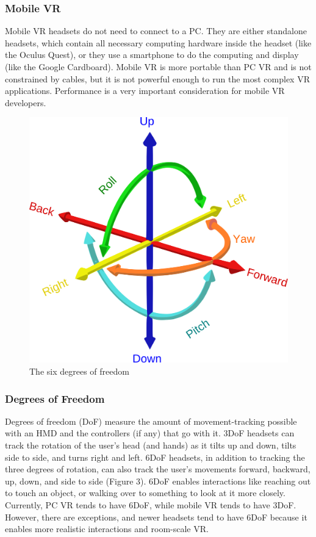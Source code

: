 \documentclass{article}
\begin{document}
\subsubsection{Mobile VR} Mobile VR headsets do not need to connect to a PC. They are either standalone headsets, which contain all necessary computing hardware inside the headset (like the Oculus Quest), or they use a smartphone to do the computing and display (like the Google Cardboard). Mobile VR is more portable than PC VR and is not constrained by cables, but it is not powerful enough to run the most complex VR applications. Performance is a very important consideration for mobile VR developers.

\begin{figure}
\centering
\includegraphics[width=.55\textwidth]{dof}
\caption{The six degrees of freedom}
\end{figure}

\subsubsection{Degrees of Freedom} Degrees of freedom (DoF) measure the amount of movement-tracking possible with an HMD and the controllers (if any) that go with it. 3DoF headsets can track the rotation of the user's head (and hands) as it tilts up and down, tilts side to side, and turns right and left. 6DoF headsets, in addition to tracking the three degrees of rotation, can also track the user's movements forward, backward, up, down, and side to side (Figure 3). 6DoF enables interactions like reaching out to touch an object, or walking over to something to look at it more closely. Currently, PC VR tends to have 6DoF, while mobile VR tends to have 3DoF. However, there are exceptions, and newer headsets tend to have 6DoF because it enables more realistic interactions and room-scale VR. 
\end{document}
